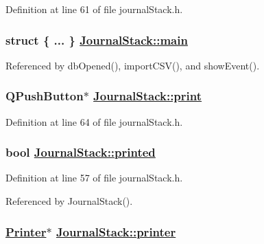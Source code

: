Definition at line 61 of file journal\-Stack.h.\hypertarget{classJournalStack_r22}{
\subsubsection[main]{\setlength{\rightskip}{0pt plus 5cm}struct \{ ... \}   \hyperlink{classJournalStack_r22}{Journal\-Stack::main}}}
\label{classJournalStack_r22}




Referenced by db\-Opened(), import\-CSV(), and show\-Event().\hypertarget{classJournalStack_r11}{
\subsubsection[print]{\setlength{\rightskip}{0pt plus 5cm}QPush\-Button$\ast$ \hyperlink{classJournalStack_r11}{Journal\-Stack::print}}}
\label{classJournalStack_r11}


Definition at line 64 of file journal\-Stack.h.\hypertarget{classJournalStack_r6}{
\subsubsection[printed]{\setlength{\rightskip}{0pt plus 5cm}bool \hyperlink{classJournalStack_r6}{Journal\-Stack::printed}}}
\label{classJournalStack_r6}


Definition at line 57 of file journal\-Stack.h.

Referenced by Journal\-Stack().\hypertarget{classJournalStack_r2}{
\subsubsection[printer]{\setlength{\rightskip}{0pt plus 5cm}\hyperlink{classPrinter}{Printer}$\ast$ \hyperlink{classJournalStack_r2}{Journal\-Stack::printer}}}
\label{classJournalStack_r2}


